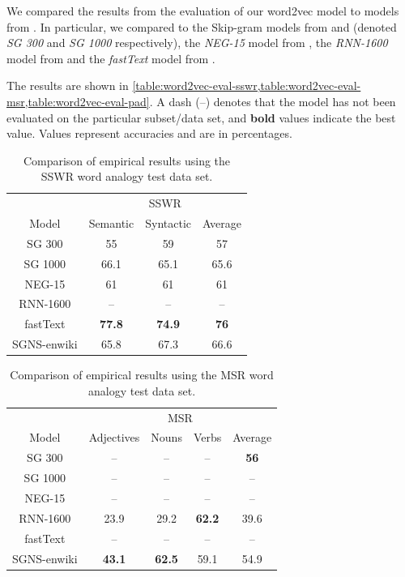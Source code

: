We compared the results from the evaluation of our word2vec model to models from \cite{mikolov2013a, mikolov2013b, mikolov-etal-2013-linguistic, bojanowski2017enriching}. In particular, we compared to the Skip-gram models from \cite[Table 3]{mikolov2013a} and \cite[Table 6]{mikolov2013a} (denoted \textit{SG 300} and \textit{SG 1000} respectively), the \textit{NEG-15} model from \cite[Table 1 and 3]{mikolov2013b}, the \textit{RNN-1600} model from \cite[Table 2]{mikolov-etal-2013-linguistic} and the \textit{fastText} model from \cite[Table 2]{bojanowski2017enriching}.

The results are shown in \cref{table:word2vec-eval-sswr,table:word2vec-eval-msr,table:word2vec-eval-pad}. A dash (--) denotes that the model has not been evaluated on the particular subset/data set, and \textbf{bold} values indicate the best value. Values represent accuracies and are in percentages.
\begin{table}[H]
    \centering
    \begin{tabular}{@{}cccc@{}}
    \toprule
    & \multicolumn{3}{c}{SSWR} \\ \cmidrule(l){2-4}
    \multirow{-2}{*}{Model} & Semantic & Syntactic & Average \\ \midrule
    \trcolor
    SG 300 & 55 & 59 & 57 \\
    SG 1000 & 66.1 & 65.1 & 65.6 \\
    \trcolor
    NEG-15 & 61 & 61 & 61 \\
    RNN-1600 & -- & -- & -- \\
    \trcolor
    fastText & \textbf{77.8} & \textbf{74.9} & \textbf{76} \\
    SGNS-enwiki & 65.8 & 67.3 & 66.6 \\
    \bottomrule
    \end{tabular}
    \caption{Comparison of empirical results using the SSWR word analogy test data set.}
    \label{table:word2vec-eval-sswr}
\end{table}
\begin{table}[H]
     \centering
    \begin{tabular}{@{}ccccc@{}}
    \toprule
    & \multicolumn{4}{c}{MSR} \\
    \cmidrule(l){2-5} 
    \multirow{-2}{*}{Model} & Adjectives & Nouns & Verbs & Average \\
    \midrule
    \trcolor
    SG 300 & -- & -- & -- & \textbf{56} \\
    SG 1000 & -- & -- & -- & -- \\
    \trcolor
    NEG-15 & -- & -- & -- & -- \\
    RNN-1600 & 23.9 & 29.2 & \textbf{62.2} & 39.6 \\
    \trcolor
    fastText & -- & -- & -- & -- \\
    SGNS-enwiki & \textbf{43.1} & \textbf{62.5} & 59.1 & 54.9 \\
    \bottomrule
    \end{tabular}
    \caption{Comparison of empirical results using the MSR word analogy test data set.}
    \label{table:word2vec-eval-msr}
\end{table}
